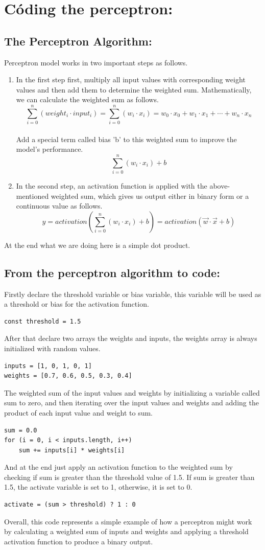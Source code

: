 \documentclass[12pt]{article}
\begin{document}
\section{Códing the perceptron:}
\subsection{The Perceptron Algorithm:}
Perceptron model works in two important steps as follows.
\begin{enumerate}
\item In the first step first, multiply all input values with corresponding weight values and then add
  them to determine the weighted sum. Mathematically, we can calculate the weighted sum as follows.\\
  \[
    \sum_{i = 0}^{n}(weight_i \cdot input_i) = \sum_{i = 0}^{n}(w_i \cdot x_i) = w_0 \cdot x_0 + w_1 \cdot x_1
    + \cdots + w_n \cdot x_n
  \]\\
  Add a special term called bias 'b' to this weighted sum to improve the model's performance.\\
  \[
    \sum_{i = 0}^{n}(w_i \cdot x_i) + b
  \]
\item In the second step, an activation function is applied with the above-mentioned weighted sum,
  which gives us output either in binary form or a continuous value as follows.\\
  \[
    y = activation(\sum_{i = 0}^{n}(w_i \cdot x_i) + b) = activation(\vec{w} \cdot \vec{x} + b)
  \]
\end{enumerate}
At the end what we are doing here is a simple dot product.
\subsection{From the perceptron algorithm to code:}
Firstly declare the threshold variable or bias variable,
this variable will be used as a threshold or bias for the activation function.
\begin{verbatim}
const threshold = 1.5
\end{verbatim}
After that declare two arrays the weights and inputs, the weights array is always initialized with random
values.
\begin{verbatim}
inputs = [1, 0, 1, 0, 1]
weights = [0.7, 0.6, 0.5, 0.3, 0.4]
\end{verbatim}
The weighted sum of the input values and weights by initializing a variable called sum to zero,
and then iterating over the input values and weights and adding the product of each input value
and weight to sum.
\begin{verbatim}
sum = 0.0
for (i = 0, i < inputs.length, i++)
    sum += inputs[i] * weights[i]
\end{verbatim}
And at the end just apply an activation function to the weighted sum by checking if sum is greater
than the threshold value of 1.5. If sum is greater than 1.5,
the activate variable is set to 1, otherwise, it is set to 0.
\begin{verbatim}
activate = (sum > threshold) ? 1 : 0
\end{verbatim}
Overall, this code represents a simple example of how a perceptron might work by calculating a
weighted sum of inputs and weights and applying a threshold activation function to produce a
binary output.
\end{document}
